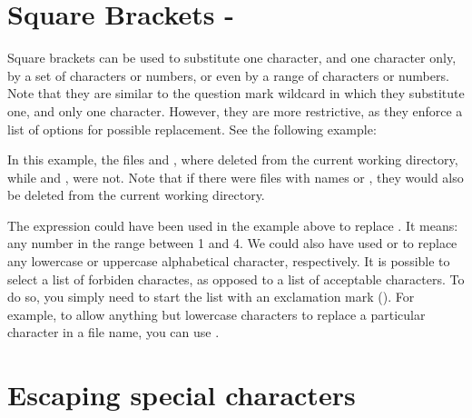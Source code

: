 \section{Square Brackets - \mycommand{{[}{]}}}
Square brackets can be used to substitute one character, and one character only, by a set of characters or numbers, or even by a range of characters or numbers. Note that they are similar to the question mark wildcard in which they substitute one, and only one character. However, they are more restrictive, as they enforce a list of options for possible replacement. See the following example:
In this example, the files  and , where deleted from the current working directory, while  and , were not. Note that if there were files with names   or , they would also be deleted from the current working directory.

The expression \mycommand{[1-4]} could have been used in the example above to replace \mycommand{[1234]}. It means: any number in the range between 1 and 4. We could also have used \mycommand{[a-z]} or \mycommand{[A-Z]} to replace any lowercase or uppercase alphabetical character, respectively. It is possible to select a list of forbiden charactes, as opposed to a list of acceptable characters. To do so, you simply need to start the list with an exclamation mark (\mycommand{!}). For example, to allow anything but lowercase characters to replace a particular character in a file name, you can use \mycommand{[!a-z]}.

\section{Escaping special characters}

